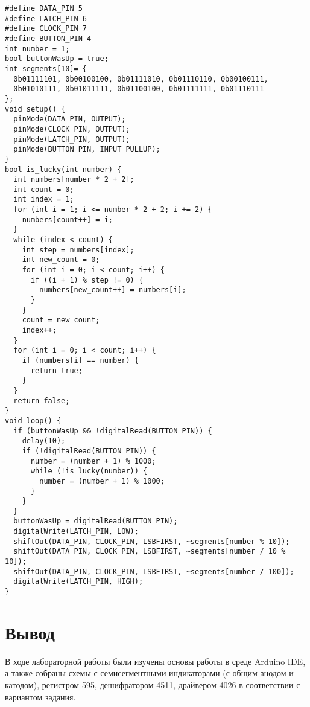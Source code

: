\documentclass[a4paper,14pt]{extarticle}
\begin{document}
  \begingroup
    \fontsize{14pt}{10pt}\selectfont
    \linespread{1}
    \begin{verbatim}
#define DATA_PIN 5
#define LATCH_PIN 6
#define CLOCK_PIN 7
#define BUTTON_PIN 4
int number = 1;
bool buttonWasUp = true;
int segments[10]= {
  0b01111101, 0b00100100, 0b01111010, 0b01110110, 0b00100111,
  0b01010111, 0b01011111, 0b01100100, 0b01111111, 0b01110111
};
void setup() {
  pinMode(DATA_PIN, OUTPUT);
  pinMode(CLOCK_PIN, OUTPUT);
  pinMode(LATCH_PIN, OUTPUT);
  pinMode(BUTTON_PIN, INPUT_PULLUP);
}
bool is_lucky(int number) {
  int numbers[number * 2 + 2];
  int count = 0;
  int index = 1;
  for (int i = 1; i <= number * 2 + 2; i += 2) {
    numbers[count++] = i;
  }
  while (index < count) {
    int step = numbers[index];
    int new_count = 0;
    for (int i = 0; i < count; i++) {
      if ((i + 1) % step != 0) {
        numbers[new_count++] = numbers[i];
      }
    }
    count = new_count;
    index++;
  }
  for (int i = 0; i < count; i++) {
    if (numbers[i] == number) {
      return true;
    }
  }
  return false;
}
void loop() {
  if (buttonWasUp && !digitalRead(BUTTON_PIN)) {
    delay(10);
    if (!digitalRead(BUTTON_PIN)) {
      number = (number + 1) % 1000;
      while (!is_lucky(number)) {
        number = (number + 1) % 1000;
      }
    }
  }
  buttonWasUp = digitalRead(BUTTON_PIN);
  digitalWrite(LATCH_PIN, LOW);
  shiftOut(DATA_PIN, CLOCK_PIN, LSBFIRST, ~segments[number % 10]);
  shiftOut(DATA_PIN, CLOCK_PIN, LSBFIRST, ~segments[number / 10 % 10]);
  shiftOut(DATA_PIN, CLOCK_PIN, LSBFIRST, ~segments[number / 100]);
  digitalWrite(LATCH_PIN, HIGH);
}
    \end{verbatim}
  \endgroup

  \section*{\hspace{12.5mm}Вывод}
  В ходе лабораторной работы были изучены основы работы в среде Arduino IDE, а также собраны схемы с семисегментными индикаторами (с общим анодом и катодом), регистром 595, дешифратором 4511, драйвером 4026 в соответствии с вариантом задания.
 
\end{document}
